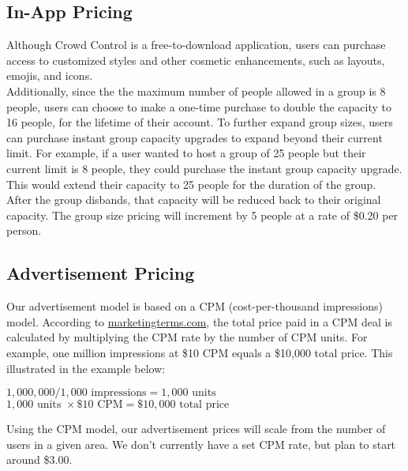 \subsection{In-App Pricing}
Although Crowd Control is a free-to-download application, users can purchase access to customized styles and other cosmetic enhancements, such as layouts, emojis, and icons. \\

Additionally, since the the maximum number of people allowed in a group is 8 people, users can choose to make a one-time purchase to double the capacity to 16 people, for the lifetime of their account. To further expand group sizes, users can purchase instant group capacity upgrades to expand beyond their current limit. For example, if a user wanted to host a group of 25 people but their current limit is 8 people, they could purchase the instant group capacity upgrade. This would extend their capacity to 25 people for the duration of the group. After the group disbands, that capacity will be reduced back to their original capacity. The group size pricing will increment by 5 people at a rate of \$0.20 per person.

\subsection{Advertisement Pricing}
Our advertisement model is based on a CPM (cost-per-thousand impressions) model. According to \url{marketingterms.com}, the total price paid in a CPM deal is calculated by multiplying the CPM rate by the number of CPM units. For example, one million impressions at \$10 CPM equals a \$10,000 total price. This illustrated in the example below:

\begin{center}
$1,000,000 / 1,000 \textrm{ impressions} = 1,000 \textrm{ units}$\\
$1,000 \textrm{ units } \times \$10 \textrm{ CPM} = \$10,000 \textrm{ total price}$
\end{center}

Using the CPM model, our advertisement prices will scale from the number of users in a given area. We don't currently have a set CPM rate, but plan to start around \$3.00.

